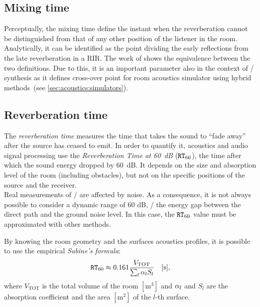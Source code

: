 \subsection{Mixing time}
Perceptually, the mixing time define the instant when the reverberation cannot be distinguished from that of any other position of the listener in the room.
Analytically, it can be identified as the point dividing the early reflections from the late reverberation in a \ac{RIR}.
The work of  shows the equivalence between the two definitions.
Due to this, it is an important parameter also in the context of \RIRs/ synthesis as it defines cross-over point for room acoustics simulator using hybrid methods~(see \cref{sec:acoustics:simulators}).

\subsection{Reverberation time}
The \textit{reverberation time} measures the time that takes the sound to ``fade away'' after the source has ceased to emit.
In order to quantify it, acoustics and audio signal processing use the \textit{Reverberation Time at 60~dB} ($\mathtt{RT}_{60}$), the time after which the sound energy dropped by 60~dB.
It depends on the size and absorption level of the room (including obstacles), but not on the specific positions of the source and the receiver.
\\Real measurements of \RIRs/ are affected by noise.
As a consequence, it is not always possible to consider a dynamic range of 60 dB,
\ie/ the energy gap between the direct path and the ground noise level.
In this case, the $\mathtt{RT}_{60}$ value must be approximated with other methods.

\noindent By knowing the room geometry and the surfaces acoustics profiles,
it is possible to use the empirical \textit{Sabine's formula}:
\begin{equation}\label{eq:processing:sabine}
    \mathtt{RT}_{60}
    \approx 0.161 \frac{V_{\text{TOT}}}{\sum_l \alpha_l S_l} \hspace{1em} [\si{\second}]
    ,
\end{equation}
where $V_{\text{TOT}}$ is the total volume of the room $[\si{\metre^3}]$ and $\alpha_l$ and $S_l$ are the
absorption coefficient and the area $[\si{\metre^2}]$  of the $l$-th surface.


